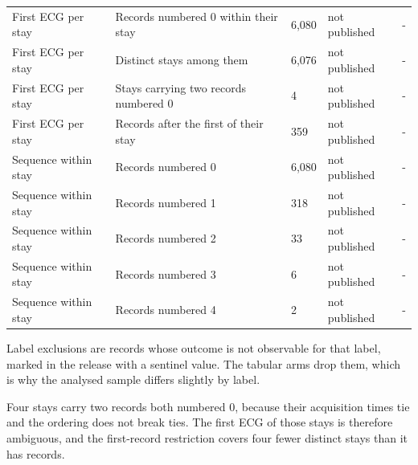 \begin{table}[t]
\begin{tabular}{lllll}
First ECG per stay & Records numbered 0 within their stay & 6,080 & not published & - \\
First ECG per stay & Distinct stays among them & 6,076 & not published & - \\
First ECG per stay & Stays carrying two records numbered 0 & 4 & not published & - \\
First ECG per stay & Records after the first of their stay & 359 & not published & - \\
Sequence within stay & Records numbered 0 & 6,080 & not published & - \\
Sequence within stay & Records numbered 1 & 318 & not published & - \\
Sequence within stay & Records numbered 2 & 33 & not published & - \\
Sequence within stay & Records numbered 3 & 6 & not published & - \\
Sequence within stay & Records numbered 4 & 2 & not published & - \\
\bottomrule
\end{tabular}
\par\footnotesize Label exclusions are records whose outcome is not observable for that label, marked in the release with a sentinel value. The tabular arms drop them, which is why the analysed sample differs slightly by label.
\par\footnotesize Four stays carry two records both numbered 0, because their acquisition times tie and the ordering does not break ties. The first ECG of those stays is therefore ambiguous, and the first-record restriction covers four fewer distinct stays than it has records.
\end{table}

